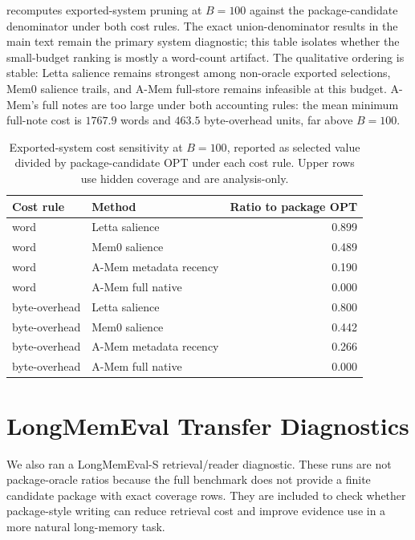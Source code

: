 \documentclass{article}
\theoremstyle{remark}
\theoremstyle{plain}
\begin{document}
 recomputes exported-system pruning at $B=100$ against the package-candidate denominator under both cost rules. The exact union-denominator results in the main text remain the primary system diagnostic; this table isolates whether the small-budget ranking is mostly a word-count artifact. The qualitative ordering is stable: Letta salience remains strongest among non-oracle exported selections, Mem0 salience trails, and A-Mem full-store remains infeasible at this budget. A-Mem's full notes are too large under both accounting rules: the mean minimum full-note cost is $1767.9$ words and $463.5$ byte-overhead units, far above $B=100$.

\begin{table}[h]
\centering
\caption{Exported-system cost sensitivity at $B=100$, reported as selected value divided by package-candidate OPT under each cost rule. Upper rows use hidden coverage and are analysis-only.}
\label{tab:sensitivity-systems}
\begin{tabular}{llr}
\toprule
Cost rule & Method & Ratio to package OPT \\
\midrule
word & Letta salience & 0.899 \\
word & Mem0 salience & 0.489 \\
word & A-Mem metadata recency & 0.190 \\
word & A-Mem full native & 0.000 \\
\midrule
byte-overhead & Letta salience & 0.800 \\
byte-overhead & Mem0 salience & 0.442 \\
byte-overhead & A-Mem metadata recency & 0.266 \\
byte-overhead & A-Mem full native & 0.000 \\
\bottomrule
\end{tabular}
\end{table}

\section{LongMemEval Transfer Diagnostics}\label{app:longmemeval}

We also ran a LongMemEval-S retrieval/reader diagnostic. These runs are not package-oracle ratios because the full benchmark does not provide a finite candidate package with exact coverage rows. They are included to check whether package-style writing can reduce retrieval cost and improve evidence use in a more natural long-memory task.
\end{document}
